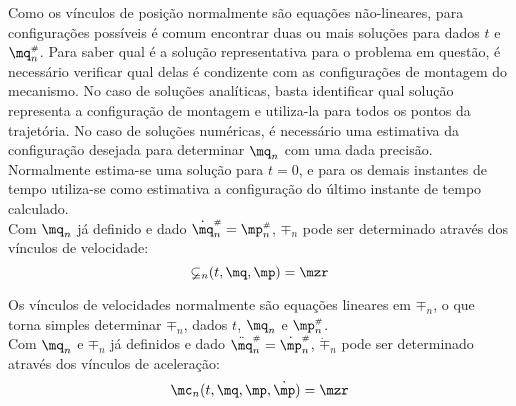 
Como os v\'inculos de posi\c{c}\~ao normalmente s\~ao equa\c{c}\~oes n\~ao-lineares, para configura\c{c}\~oes poss\'iveis \'e comum encontrar duas ou mais solu\c{c}\~oes para dados $t$ e $\mq_n\ssh$. Para saber qual \'e a solu\c{c}\~ao representativa para o problema em quest\~ao, \'e necess\'ario verificar qual delas \'e condizente com as configura\c{c}\~oes de montagem do mecanismo. No caso de solu\c{c}\~oes anal\'iticas, basta identificar qual solu\c{c}\~ao representa a configura\c{c}\~ao de montagem e utiliza-la para todos os pontos da trajet\'oria. No caso de solu\c{c}\~oes num\'ericas, \'e necess\'ario uma estimativa da configura\c{c}\~ao desejada para determinar $\mq_n$ com uma dada precis\~ao. Normalmente estima-se uma solu\c{c}\~ao para $t=0$, e para os demais instantes de tempo utiliza-se como estimativa a configura\c{c}\~ao do \'ultimo instante de tempo calculado. \\

Com $\mq_n$ j\'a definido e dado $\dot{\mq}_n\ssh = \mp_n\ssh$, $\mp_n$ pode ser determinado atrav\'es dos v\'inculos de velocidade:
\begin{equation} \label{eq:VelocityConstraints}
\mathbb{\psi}_n (t, \mq, \mp) = \mzr
\end{equation}


Os v\'inculos de velocidades normalmente s\~ao equa\c{c}\~oes lineares em $\mp_n$, o que torna simples determinar $\mp_n$, dados $t$, $\mq_n$ e $\mp_n\ssh$. \\

Com $\mq_n$ e $\mp_n$ j\'a definidos e dado $\ddot{\mq}_n\ssh = \dot{\mp}_n\ssh$, $\dot{\mp}_n$ pode ser determinado atrav\'es dos v\'inculos de acelera\c{c}\~ao:
\begin{equation} \label{eq:AccelerationConstraints}
\mc_n (t, \mq, \mp, \dot{\mp}) = \mzr
\end{equation}

